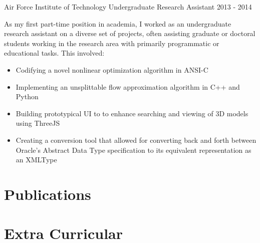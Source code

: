 \documentclass[11pt,a4paper,sans]{moderncv} %
\begin{document}
			 {Air Force Institute of Technology}
			 {Undergraduate Research Assistant}
			 {2013 - 2014}{}{\vspace{3pt}
As my first part-time position in academia, I worked as an undergraduate research assistant on a diverse set of projects, often assisting graduate or doctoral students working in the research area with primarily programmatic or educational tasks. This involved: 
\begin{itemize}
	\item Codifying a novel nonlinear optimization algorithm in ANSI-C
	\item Implementing an unsplittable flow approximation algorithm in C++ and Python
	\item Building prototypical UI to to enhance searching and viewing of 3D models using ThreeJS
	\item Creating a conversion tool that allowed for converting back and forth between Oracle's Abstract Data Type specification to its equivalent representation as an XMLType 
\end{itemize}	
}
\section{Publications}





\section{Extra Curricular}

\end{document}
